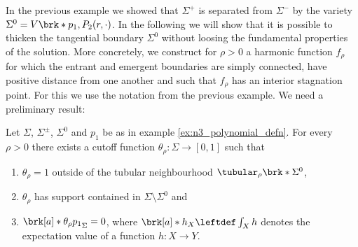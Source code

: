 In the previous example we showed that $\Sigma^+$ is separated from $\Sigma^-$ by the variety
$\Sigma^0=V\brk*{p_1,P_2(r,\cdot)}$. In the following we will show that it is possible to thicken 
the tangential boundary $\Sigma^0$ without loosing the fundamental properties of the solution. 
More concretely, we construct for $\rho>0$ a harmonic function $f_\rho$ for which the entrant and
emergent boundaries are simply connected, have positive distance from one another
and such that $f_\rho$ has an interior stagnation point.
For this we use the notation from the previous example.
We need a preliminary result:
\begin{proposition}\label{pr:n3_thickening_cutoff}
  Let $\Sigma$, $\Sigma^\pm$, $\Sigma^0$ and $p_1$ be as in example \ref{ex:n3_polynomial_defn}. For every $\rho>0$ there exists a cutoff function $\theta_\rho\colon\Sigma\to[0,1]$ such that
  \begin{enumerate}
    \item $\theta_\rho=1$ outside of the tubular neighbourhood $\tubular_{\rho}\brk*{\Sigma^0}$,\label{en:n3_thickening_cutoff_1}
    \item $\theta_\rho$ has support contained in $\Sigma\setminus\Sigma^0$ and\label{en:n3_thickening_cutoff_2}
    \item $\brk[a]*{\theta_\rho p_1}_\Sigma=0$, where $\brk[a]*{h}_X\leftdef\int_Xh$ denotes the expectation value of a function $h\colon X\to Y$.\label{en:n3_thickening_cutoff_3}
  \end{enumerate}
\end{proposition}

